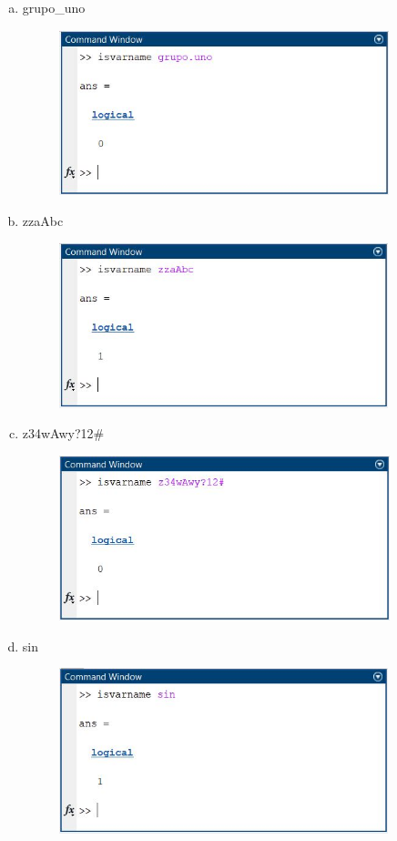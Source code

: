 \documentclass{article}
\begin{document}
\begin{enumerate}[a)]
\begin{figure}[H]
        \end{figure}
    \item grupo\_uno
        \begin{figure}[H]
        \centering
        \includegraphics[height=4.8cm]{img6h.jpg}
        \end{figure}
    \item zzaAbc
        \begin{figure}[H]
        \centering
        \includegraphics[height=4.8cm]{img6i.jpg}
        \end{figure}
    \item z34wAwy?12\#
        \begin{figure}[H]
        \centering
        \includegraphics[height=4.8cm]{img6j.jpg}
        \end{figure}
    \item sin
        \begin{figure}[H]
        \centering
        \includegraphics[height=4.8cm]{img6k.jpg}

\end{figure}
\end{enumerate}
\end{document}
